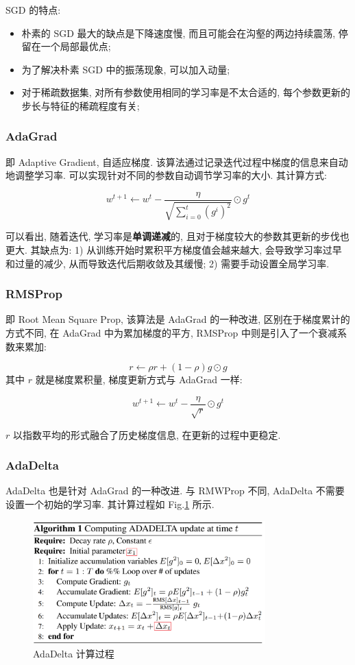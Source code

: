 SGD 的特点: 
\begin{itemize}
	\item 朴素的 SGD 最大的缺点是下降速度慢, 而且可能会在沟壑的两边持续震荡, 停留在一个局部最优点;
	
	\item 为了解决朴素 SGD 中的振荡现象, 可以加入动量;
	
	\item 对于稀疏数据集, 对所有参数使用相同的学习率是不太合适的, 每个参数更新的步长与特征的稀疏程度有关;
\end{itemize}

\subsubsection{AdaGrad}
即 Adaptive Gradient, 自适应梯度. 该算法通过记录迭代过程中梯度的信息来自动地调整学习率. 可以实现针对不同的参数自动调节学习率的大小. 其计算方式:

$$
w^{t+1} \leftarrow w^t - \frac{\eta}{\sqrt{\sum_{i=0}^t (g^i)^2}} \odot g^t
$$

可以看出, 随着迭代, 学习率是\textbf{单调递减}的, 且对于梯度较大的参数其更新的步伐也更大. 其缺点为: 1) 从训练开始时累积平方梯度值会越来越大, 会导致学习率过早和过量的减少, 从而导致迭代后期收敛及其缓慢; 2) 需要手动设置全局学习率. 

\subsubsection{RMSProp}
即 Root Mean Square Prop, 该算法是 AdaGrad 的一种改进, 区别在于梯度累计的方式不同, 在 AdaGrad 中为累加梯度的平方, RMSProp 中则是引入了一个衰减系数来累加:

$$
r \leftarrow \rho r + (1 - \rho) g \odot g
$$
其中 $r$ 就是梯度累积量, 梯度更新方式与 AdaGrad 一样:

$$
w^{t+1} \leftarrow w^t - \frac{\eta}{\sqrt{r}} \odot g^t
$$

$r$ 以指数平均的形式融合了历史梯度信息, 在更新的过程中更稳定.

\subsubsection{AdaDelta}
AdaDelta 也是针对 AdaGrad 的一种改进. 与 RMWProp 不同, AdaDelta 不需要设置一个初始的学习率. 其计算过程如 Fig.\ref{fig:adadelta} 所示.

\begin{figure}[h]
	\centering
	\includegraphics[width=0.8\textwidth]{pics/adadelta.png}
	\caption{AdaDelta 计算过程}
	\label{fig:adadelta}
\end{figure}

